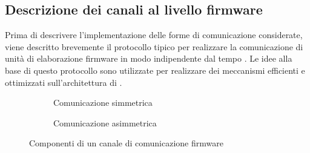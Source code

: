 \subsection{Descrizione dei canali al livello firmware}
\label{sct:ch_firmware}
Prima di descrivere l'implementazione delle forme di comunicazione considerate, viene descritto brevemente il protocollo tipico per realizzare la comunicazione di unit\`a di elaborazione firmware in modo indipendente dal tempo \cite{vanneschi2009architettura}. Le idee alla base di questo protocollo sono utilizzate per realizzare dei meccanismi efficienti e ottimizzati sull'architettura di \tile.
\begin{figure}[!b]
  \begin{subfigure}[b]{.5\textwidth}
    \centering
    \caption{Comunicazione simmetrica}
    \label{fig:fwcomm_sym}
  \end{subfigure}
  \begin{subfigure}[b]{.5\textwidth}
    \centering
    \caption{Comunicazione asimmetrica}
    \label{fig:fwcomm_asym}
  \end{subfigure}
  \caption{Componenti di un canale di comunicazione firmware}
  \label{fig:fwcomm}
\end{figure}

